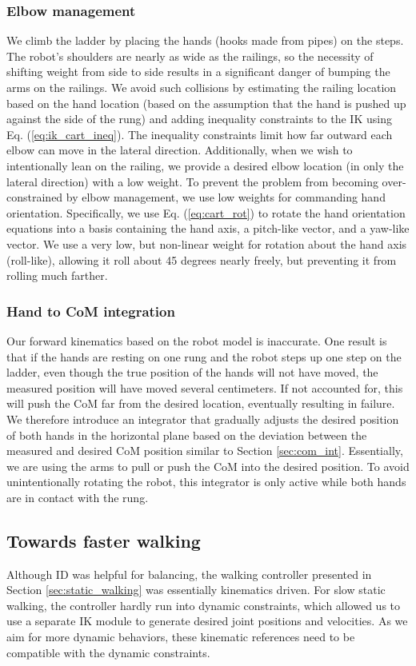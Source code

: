 \documentclass{ws-ijhr}
\newcommand{\eref}[1] {Eq. (\ref{#1})}
\newcommand{\sref}[1] {Section \ref{#1}}
\begin{document}
\subsubsection{Elbow management}
We climb the ladder by placing the hands (hooks made from pipes) on the steps.
The robot's shoulders are nearly as wide as the railings, so the necessity of 
shifting weight from side to side results in a significant danger of bumping 
the arms on the railings. We avoid such collisions by estimating the railing 
location based on the hand location (based on the assumption that the hand 
is pushed up against the side of the rung) and adding inequality constraints 
to the IK using \eref{eq:ik_cart_ineq}. 
The inequality constraints limit how far outward each elbow can 
move in the lateral direction. Additionally, when we wish to intentionally 
lean on the railing, we provide a desired elbow location (in only the 
lateral direction) with a low weight. To prevent the problem from becoming 
over-constrained by elbow management, we use low weights for commanding hand 
orientation. Specifically, we use \eref{eq:cart_rot} to rotate the hand 
orientation equations into a basis containing the hand axis, a pitch-like 
vector, and a yaw-like vector. We use a very low, but non-linear weight for 
rotation about the hand axis (roll-like), allowing it roll about 45 degrees 
nearly freely, but preventing it from rolling much farther.

\subsubsection{Hand to CoM integration}
Our forward kinematics based on the robot model is inaccurate. 
One result is that if 
the hands are resting on one rung and the robot steps up one step on the 
ladder, even though the true position of the hands will not have moved, the 
measured position will have moved several centimeters. If not accounted for, 
this will push the CoM far from the desired location, eventually resulting 
in failure. We therefore introduce an integrator that gradually adjusts the 
desired position of both hands in the horizontal plane based on the deviation 
between the measured and desired CoM position similar to \sref{sec:com_int}. 
Essentially, we are using the 
arms to pull or push the CoM into the desired position. To avoid unintentionally 
rotating the robot, this integrator is only active while both hands are in 
contact with the rung. 

\subsection{Towards faster walking}
Although ID was helpful for balancing, the walking controller presented in 
\sref{sec:static_walking} was essentially kinematics driven. 
For slow static walking, the controller hardly run into dynamic constraints, 
which allowed us to use a separate IK module to generate desired joint 
positions and velocities. 
As we aim for more dynamic behaviors, these kinematic references need to be 
compatible with the dynamic constraints. 
\end{document}
